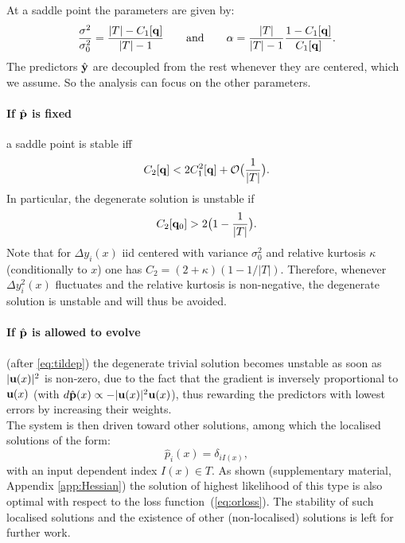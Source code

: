 At a saddle point the parameters are given by:
%
\[
  \frac{\sigma^2}{\sigma_0^2} = 
    \frac{\vert T\vert-C_1[{\bf q}]}{\vert T\vert-1} 
    \qquad\text{and}\qquad
    \alpha = \frac{\vert T\vert}{\vert T\vert-1}\frac{1-C_1[{\bf q}]}{C_1[{\bf q}]}.
\]
%
The predictors $\hat {\bf y}$ are decoupled from  the rest whenever they are centered, which we 
assume. So the analysis can focus on the other parameters. 
\paragraph{If $\hat {\bf p}$ is fixed} a saddle point is stable iff
%
\[
  C_2[{\bf q}] < 2C_1^2[{\bf q}]+{\cal O}\bigl(\frac{1}{\vert T\vert}\bigr).
\]
%
In particular, the degenerate solution is unstable if
%
\[
  C_2[{\bf q}_0] > 2\bigl(1-\frac{1}{\vert T\vert}\bigr).
\]
%
Note that for $\Delta y_i(x)$ iid centered with variance $\sigma_0^2$ and relative kurtosis 
$\kappa$ (conditionally to $x$) one has $C_2 = (2+\kappa)(1-1/\vert T\vert)$. Therefore, 
whenever $\Delta y_i^2(x)$ fluctuates and the relative kurtosis is non-negative,
the degenerate solution is unstable and will thus be avoided.

\paragraph{If $\hat {\bf p}$ is allowed to evolve} (after \cref{eq:tildep}) the degenerate trivial 
solution becomes unstable as soon as $\vert {\bf u}(x)\vert^2$ is non-zero, due to the fact that 
the gradient is inversely proportional to ${\bf u}(x)$ (with 
$d\hat{\bf p}(x)\propto -\vert {\bf u}(x)\vert^2 {\bf u}(x)$), thus rewarding the predictors with lowest 
errors by increasing their weights. \\

The system is then driven toward other solutions, among which the localised solutions of the form:
% 
\[
  \hat p_i(x) = \delta_{iI(x)},
\]
%
with an input dependent index $I(x)\in T$. As shown (supplementary material, Appendix 
\ref{app:Hessian}) the solution of highest likelihood of this type is also optimal with respect to 
the loss function~(\cref{eq:orloss}). The stability of such localised solutions and the existence 
of other (non-localised) solutions is left for further work.  


